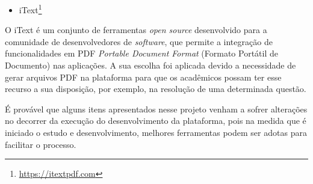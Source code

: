 \begin{itemize}
    \item iText\footnote[11]{\url{https://itextpdf.com}}
\end{itemize}
O iText é um conjunto de ferramentas \textit{open source} desenvolvido para a comunidade de desenvolvedores de \textit{software}, que permite a integração de funcionalidades em PDF \textit{Portable Document Format} (Formato Portátil de Documento) nas aplicações. A sua escolha foi aplicada devido a necessidade de gerar arquivos PDF na plataforma para que os acadêmicos possam ter esse recurso a sua disposição, por exemplo, na resolução de uma determinada questão.

É provável que alguns itens apresentados nesse projeto venham a sofrer alterações no decorrer da execução do desenvolvimento da plataforma, pois na medida que é iniciado o estudo e desenvolvimento, melhores ferramentas podem ser adotas para facilitar o processo.